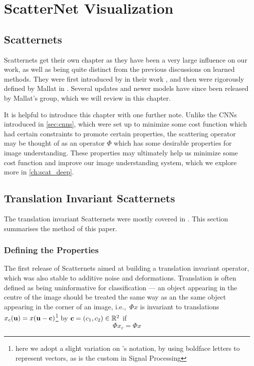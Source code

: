 \chapter{ScatterNet Visualization}
\section{Scatternets}\label{ch:scatternets}

  Scatternets get their own chapter as they have been a very large influence on
  our work, as well as being quite distinct from the previous discussions on
  learned methods. They were first introduced by  
  \citeauthor{bruna_classification_2011} in their work 
  \citep{bruna_classification_2011}, and then were rigorously defined by Mallat
  in \citep{mallat_group_2012}. Several updates and newer models have since
  been released by Mallat's group, which we will review in this chapter.
  
  It is helpful to introduce this chapter with one further note. Unlike the
  CNNs introduced in \autoref{sec:cnns}, which were set up to minimize some
  cost function which had certain constraints to promote certain properties,
  the scattering operator may be thought of as an operator $\Phi$ which has
  some desirable properties for image understanding. These properties may
  ultimately help us minimize some cost function and improve our image
  understanding system, which we explore more in
  \autoref{ch:scat_deep}.


  \section{Translation Invariant Scatternets}
  The translation invariant Scatternets were mostly covered in
  \citep{bruna_invariant_2013}. This section summarises the method of this
  paper.

  \subsection{Defining the Properties}
  The first release of Scatternets aimed at building a translation invariant
  operator, which was also stable to additive noise and deformations. Translation
  is often defined as being uninformative for classification --- an object
  appearing in the centre of the image should be treated the same way as an
  the same object appearing in the corner of an image, i.e.,\ $\Phi x$ is
  invariant to translations $x_c(\mathbf{u}) = x(\mathbf{u}-\mathbf{c})$\footnote{here
  we adopt a slight variation on \Bruna's notation, by using boldface letters to
  represent vectors, as is the custom in Signal Processing} by 
  $\mathbf{c}=(c_1,c_2) \in \mathbb{R}^2$ if
  \begin{equation}\label{eq:scat_trans_invariance}
    \Phi x_c = \Phi x
  \end{equation}

